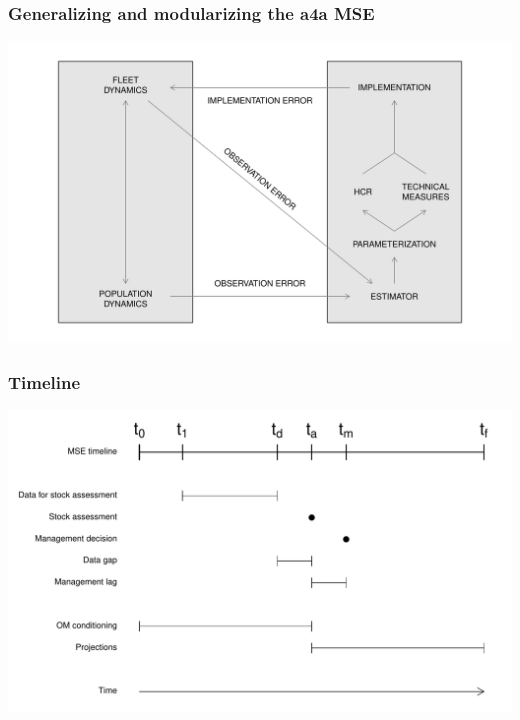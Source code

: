 \documentclass{beamer}\usepackage[]{graphicx}\usepackage[]{color}
\begin{document}
\begin{frame}
\frametitle{Generalizing and modularizing the a4a MSE}
	
\begin{center}
\includegraphics[height=0.95\textheight]{msea4a2}
\end{center}
	
\end{frame}

\begin{frame}
\frametitle{Timeline}
	
\begin{center}
\includegraphics[height=0.95\textheight]{timeline}
\end{center}
	
\end{frame}
\end{document}
